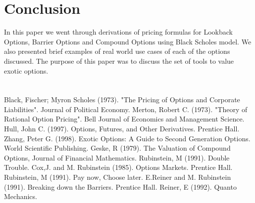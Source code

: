 \documentclass{article}
\begin{document}
\section{Conclusion}
In this paper we went through derivations of pricing formulas for Lookback Options, Barrier Options and Compound Options using Black Scholes model.  We also presented brief examples of real world use cases of each of the options discussed.  The purpose of this paper was to discuss the set of tools to value exotic options.

\newpage
\section*{} \label{bibsection}


\begin{thebibliography}{MMMMM} 
 Black, Fischer; Myron Scholes (1973). "The Pricing of Options and Corporate Liabilities". Journal of Political Economy.
 Merton, Robert C. (1973). "Theory of Rational Option Pricing". Bell Journal of Economics and Management Science.
 Hull, John C. (1997). Options, Futures, and Other Derivatives. Prentice Hall.
 Zhang, Peter G. (1998). Exotic Options: A Guide to Second Generation Options. World Scientific Publishing.
 Geske, R (1979). The Valuation of Compound Options, Journal of Financial Mathematics.
 Rubinstein, M (1991). Double Trouble.
 Cox,J. and M. Rubinstein (1985). Options Markets. Prentice Hall.
 Rubinstein, M (1991). Pay now, Choose later.
 E.Reiner and M. Rubinstein (1991). Breaking down the Barriers. Prentice Hall.
 Reiner, E (1992). Quanto Mechanics.


\end{thebibliography}


\end{document}
